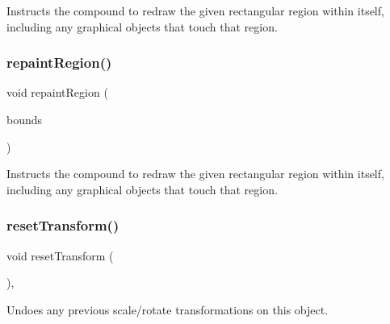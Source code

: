 Instructs the compound to redraw the given rectangular region within itself, including any graphical objects that touch that region. 

\mbox{\label{classsgl_1_1GCompound_a769c46fb3e1004aec76e8b0adfa42aa6}} 
\subsubsection{\texorpdfstring{repaint\+Region()}{repaintRegion()}\hspace{0.1cm}{\footnotesize\ttfamily [2/2]}}
{\footnotesize\ttfamily void repaint\+Region (\begin{DoxyParamCaption}\item[{const \mbox{\hyperlink{structsgl_1_1GRectangle}{G\+Rectangle}} \&}]{bounds }\end{DoxyParamCaption})\hspace{0.3cm}{\ttfamily [virtual]}}



Instructs the compound to redraw the given rectangular region within itself, including any graphical objects that touch that region. 

\mbox{\label{classsgl_1_1GObject_a6022a1fd1e5dcd2fd5585e5a36aa3f37}} 
\subsubsection{\texorpdfstring{reset\+Transform()}{resetTransform()}}
{\footnotesize\ttfamily void reset\+Transform (\begin{DoxyParamCaption}{ }\end{DoxyParamCaption})\hspace{0.3cm}{\ttfamily [virtual]}, {\ttfamily [inherited]}}



Undoes any previous scale/rotate transformations on this object. 

\mbox{\label{classsgl_1_1GObject_ae1ffaa12185dfd5ba464f7d87c329e26}} 
